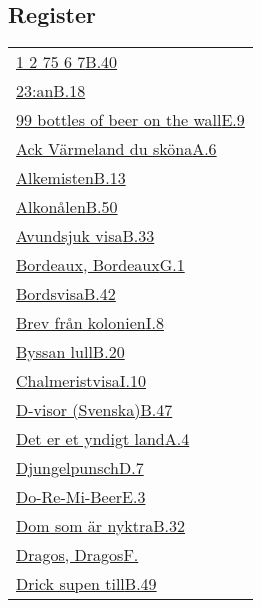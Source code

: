 \begin{flushleft}
\section{Register}
\end{flushleft}
\begin{longtable}[h]{@{}p{\linewidth}@{}}%
\endfirsthead
\endhead
\endfoot
\endlastfoot  \hyperref[etttva]{1 2 75 6 7}\dotfill\hyperref[etttva]{B.40}\\
  \hyperref[tjutrean]{23:an}\dotfill\hyperref[tjutrean]{B.18}\\
  \hyperref[bottlesofbeer]{99 bottles of beer on the wall}\dotfill\hyperref[bottlesofbeer]{E.9}\\
  \hyperref[varmeland]{Ack Värmeland du sköna}\dotfill\hyperref[varmeland]{A.6}\\
  \hyperref[alkemisten]{Alkemisten}\dotfill\hyperref[alkemisten]{B.13}\\
  \hyperref[alkonalen]{Alkonålen}\dotfill\hyperref[alkonalen]{B.50}\\
  \hyperref[avundsjukvisa]{Avundsjuk visa}\dotfill\hyperref[avundsjukvisa]{B.33}\\
  \hyperref[bordeaux]{Bordeaux, Bordeaux}\dotfill\hyperref[bordeaux]{G.1}\\
  \hyperref[bordsvisa]{Bordsvisa}\dotfill\hyperref[bordsvisa]{B.42}\\
  \hyperref[brevfrankolonien]{Brev från kolonien}\dotfill\hyperref[brevfrankolonien]{I.8}\\
  \hyperref[byssanlull]{Byssan lull}\dotfill\hyperref[byssanlull]{B.20}\\
  \hyperref[chalmeristvisa]{Chalmeristvisa}\dotfill\hyperref[chalmeristvisa]{I.10}\\
  \hyperref[dvisorsvenska]{D-visor (Svenska)}\dotfill\hyperref[dvisorsvenska]{B.47}\\
  \hyperref[yndigtland]{Det er et yndigt land}\dotfill\hyperref[yndigtland]{A.4}\\
  \hyperref[djungelpunsch]{Djungelpunsch}\dotfill\hyperref[djungelpunsch]{D.7}\\
  \hyperref[doremi]{Do-Re-Mi-Beer}\dotfill\hyperref[doremi]{E.3}\\
  \hyperref[nyktra]{Dom som är nyktra}\dotfill\hyperref[nyktra]{B.32}\\
  \hyperref[dragosdragos]{Dragos, Dragos}\dotfill\hyperref[dragosdragos]{F.}\\
  \hyperref[dricksupentill]{Drick supen till}\dotfill\hyperref[dricksupentill]{B.49}\\

\end{longtable}
